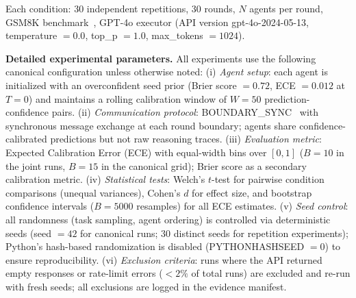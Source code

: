 \documentclass[11pt]{article}
\theoremstyle{definition}
\theoremstyle{remark}
\begin{document}
Each condition: 30 independent repetitions, 30 rounds, $N$ agents per round, GSM8K benchmark~\citep{cobbe2021gsm8k}, GPT-4o executor (API version gpt-4o-2024-05-13, temperature $=0.0$, top\_p $=1.0$, max\_tokens $=1024$).

\textbf{Detailed experimental parameters.} All experiments use the following canonical configuration unless otherwise noted: (i) \textit{Agent setup}: each agent is initialized with an overconfident seed prior (Brier score $=0.72$, ECE $=0.012$ at $T{=}0$) and maintains a rolling calibration window of $W{=}50$ prediction-confidence pairs. (ii) \textit{Communication protocol}: BOUNDARY\_SYNC~\citep{boundarysync2026} with synchronous message exchange at each round boundary; agents share confidence-calibrated predictions but not raw reasoning traces. (iii) \textit{Evaluation metric}: Expected Calibration Error (ECE) with equal-width bins over $[0,1]$ ($B{=}10$ in the joint runs, $B{=}15$ in the canonical grid); Brier score as a secondary calibration metric. (iv) \textit{Statistical tests}: Welch's $t$-test for pairwise condition comparisons (unequal variances), Cohen's $d$ for effect size, and bootstrap confidence intervals ($B{=}5000$ resamples) for all ECE estimates. (v) \textit{Seed control}: all randomness (task sampling, agent ordering) is controlled via deterministic seeds (seed $=42$ for canonical runs; 30 distinct seeds for repetition experiments); Python's hash-based randomization is disabled (PYTHONHASHSEED $=0$) to ensure reproducibility. (vi) \textit{Exclusion criteria}: runs where the API returned empty responses or rate-limit errors ($<2\%$ of total runs) are excluded and re-run with fresh seeds; all exclusions are logged in the evidence manifest.
\end{document}

